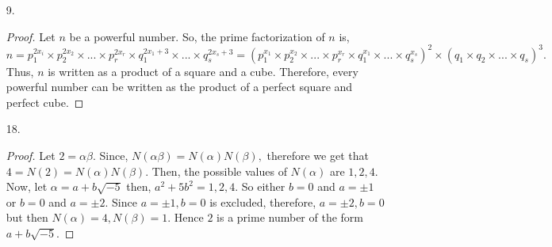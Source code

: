 \documentclass[11pt]{article}
\theoremstyle{definition}
\newcommand{\Z}{\mathbb{Z}}
\begin{document}
\begin{enumerate}
    \begin{proof}
    Let $m\in \Z$ so that $d$ has no more than $m$ bits and that $q$ has $2m$ bits, appending extra 0 to the front of $q$ is necessary. Then, $m = O(\log_2q) = O(\log_2d)$. Then we can use the algorithm for dividing $q$ by $d$ in $O(m^2) = O(\log_2q\log_2d)$ bit operations. Now let $n$ be the number of steps needed in the Euclidean algorithm to find $(a, b).$ Then we know that $n = O(\log_2a).$ Let $q, r$, then the total number of bit operations for divisions in the Euclidean algorithm is $\sum_{i = 1}^n O(\log_2q\log_2r) = \sum_{i = 1}^nO(\log_2q\log_2b) = O(\log_2b\sum_{i = 1}^n\log_2q_i) = O(\log_2b\log\prod_{i=1}^nq_i.$ Dropping the remainders in each step of the Euclidean algorithm, the system of inequalities $r_i \geq r_{i+1}q_{i+1}$ for $i=0, 1, 2, ..., n-1$, multiplying these inequalities together yields $\prod_{i=0}^{n-1}r_i\geq \prod_{i=1}^lr_iq_i$. Cancelling common factors reduces this to $a = r_0 \geq r_n\prod_{i = 1}^n q_i.$ Therefore, from above, the total number of bit operations is $O(\log_2b\log_2\prod_{i=1}^nq_i) = O(\log_2b\log_2a) = O((\log_2a)^2).$
    \end{proof}
    
    \newpage
    \item [9. ]
    
    \begin{proof}
    Let $n$ be a powerful number. So, the prime factorization of $n$ is, $n = p_1^{2x_i} \times p_2^{2x_2} \times ... \times p_r^{2x_r} \times q_1^{2x_1+3} \times ... \times q_s^{2x_s+3} = (p_1^{x_1} \times p_2^{x_2} \times ... \times p_r^{x_r} \times q_1^{x_1} \times ... \times q_s^{x_s})^2\times(q_1\times q_2\times ... \times q_s)^3.$ Thus, $n$ is written as a product of a square and a cube. Therefore, every powerful number can be written as the product of a perfect square and perfect cube.
    \end{proof}
    
    \newpage
    \item [18. ]
    
    \begin{proof}
    Let $2 = \alpha\beta$. Since, $N(\alpha\beta) = N(\alpha)N(\beta),$ therefore we get that $4 = N(2) = N(\alpha)N(\beta).$ Then, the possible values of $N(\alpha)$ are $1, 2, 4$. Now, let $\alpha = a + b\sqrt{-5}$ then, $a^2 + 5b^2 = 1, 2, 4.$ So either $b=0$ and $a = \pm 1$ or $b = 0$ and $a = \pm 2.$ Since $a = \pm1, b =0$  is excluded, therefore, $a = \pm 2, b=0$ but then $N(\alpha) = 4, N(\beta) = 1.$ Hence $2$ is a prime number of the form $a + b\sqrt{-5}.$
    \end{proof}
    
\end{enumerate}
\end{document}
